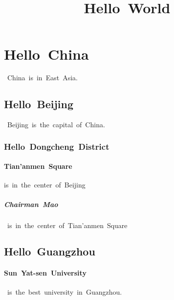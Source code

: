 \documentclass{article}
\title{Hello World}
\begin{document}
\maketitle
\section{Hello China} China is in East Asia.
   \subsection{Hello Beijing} Beijing is the capital of China.  
   \subsubsection{Hello Dongcheng District}
   \paragraph{Tian'anmen Square}is in the center of Beijing
   \subparagraph{Chairman Mao} is in the center of Tian'anmen Square
   \subsection{Hello Guangzhou}
   \paragraph{Sun Yat-sen University} is the best university in Guangzhou.
\end{document}

